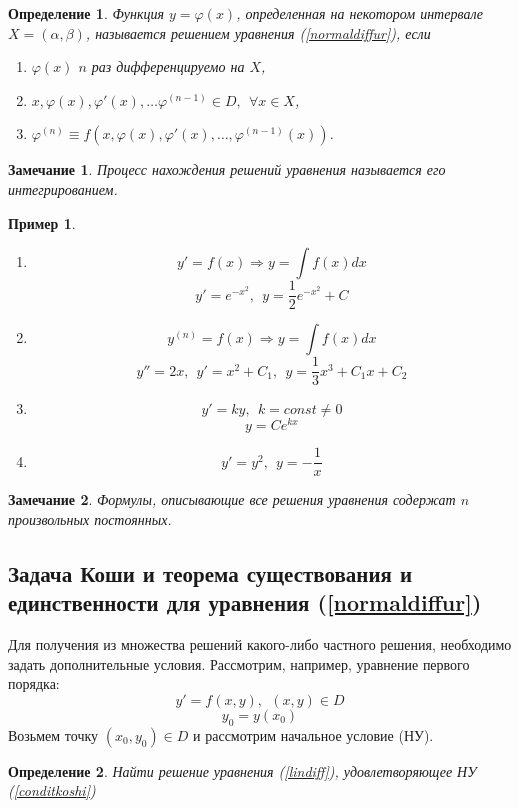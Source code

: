 \documentclass{article}
\newtheorem*{df}{Определение}
\newtheorem*{ntc}{Замечание}
\newtheorem{xmp}{Пример}
\begin{document}
  \begin{df}
  Функция $y = \varphi(x)$, определенная на некотором интервале $X = (\alpha, \beta)$, называется решением уравнения (\ref{normaldiffur}), если 
  \begin{enumerate}
  \item $\varphi(x)$ $n$ раз дифференцируемо на $X$,
  \item $x, \varphi(x), \varphi'(x), \ldots \varphi^{(n - 1)} \in D,~~ \forall x \in X$,
  \item $\varphi^{(n)} \equiv f(x, \varphi(x), \varphi'(x), \ldots, \varphi^{(n - 1)}(x))$.
  \end{enumerate}
  \end{df}
  \begin{ntc}
  Процесс нахождения решений уравнения называется его интегрированием.
  \end{ntc}
  
  \begin{xmp}
  ~
  \begin{enumerate}
  \item $$ y' = f(x) \Rightarrow y = \int f(x) dx $$
  $$ y' = e^{-x^2},~~ y = \frac{1}{2}e^{-x^2} + C $$
  \item $$ y^{(n)} = f(x) \Rightarrow y = \int f(x) dx $$
  $$ y'' = 2x,~~ y' = x^2 + C_1,~~ y = \frac{1}{3}x^3 + C_1 x + C_2 $$ 
  \item $$ y' = ky,~~ k = const \neq 0 $$
  $$ y = Ce^{kx} $$
  \item $$ y' = y^2,~~ y = -\frac{1}{x} $$
  \end{enumerate}
  \end{xmp}

  \begin{ntc}
  Формулы, описывающие все решения уравнения содержат $n$ произвольных постоянных.
  \end{ntc}  
  
  \subsection*{Задача Коши и теорема существования и единственности для уравнения (\ref{normaldiffur})}
  Для получения из множества решений какого-либо частного решения, необходимо задать дополнительные условия. Рассмотрим, например, уравнение первого порядка:
  \begin{equation}
  \label{lindiff}
     y' = f(x, y),~~ (x,y) \in D
  \end{equation}
  \begin{equation}
  \label{conditkoshi}
  y_0 = y(x_0)
  \end{equation}
  Возьмем точку $(x_0, y_0) \in D$ и рассмотрим начальное условие (НУ).
  \begin{df}
  Найти решение уравнения (\ref{lindiff}), удовлетворяющее НУ (\ref{conditkoshi})
  \end{df}
  
\end{document}
